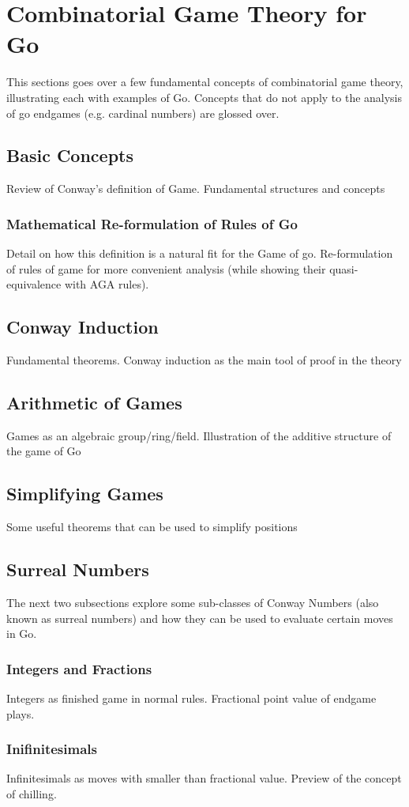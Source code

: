 \documentclass[../math_194_paper.tex]{subfiles}
\begin{document}
\section{Combinatorial Game Theory for Go}

This sections goes over a few fundamental concepts of combinatorial game 
theory, illustrating each with examples of Go. Concepts that do not apply 
to the analysis of go endgames (e.g. cardinal numbers) are glossed over.

\subsection{Basic Concepts}
Review of Conway's definition of Game. Fundamental structures and 
concepts

\subsubsection{Mathematical Re-formulation of Rules of Go}
Detail on how this definition is a natural fit for the Game of go. 
Re-formulation of rules of game for more convenient analysis 
(while showing their quasi-equivalence with AGA rules). 

\subsection{Conway Induction}
Fundamental theorems. Conway induction as the main tool of proof in the 
theory

\subsection{Arithmetic of Games}
Games as an algebraic group/ring/field. Illustration of the additive 
structure of the game of Go

\subsection{Simplifying Games}

Some useful theorems that can be used to simplify positions 

\subsection{Surreal Numbers}
The next two subsections explore some sub-classes of Conway Numbers 
(also known as surreal numbers) and how they can be used to evaluate 
certain moves in Go.

\subsubsection{Integers and Fractions}

Integers as finished game in normal rules. Fractional point value 
of endgame plays.

\subsubsection{Inifinitesimals}

Infinitesimals as moves with smaller than fractional value. 
Preview of the concept of chilling.
\end{document}
